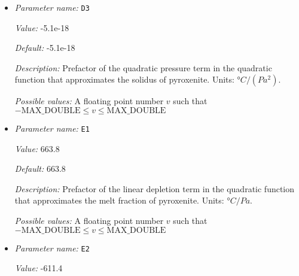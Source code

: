 \begin{itemize}
{\it Value:} 1.329e-7


{\it Default:} 1.329e-7


{\it Description:} Prefactor of the linear pressure term in the quadratic function that approximates the solidus of pyroxenite. Note that this factor is different from the value given in Sobolev, 2011, because they use the potential temperature whereas we use the absolute temperature. Units: $°C/Pa$.


{\it Possible values:} A floating point number $v$ such that $-\text{MAX\_DOUBLE} \leq v \leq \text{MAX\_DOUBLE}$
\item {\it Parameter name:} {\tt D3}
\label{parameters:Postprocess/Visualization/Melt fraction/D3}
\label{parameters:Postprocess/Visualization/Melt_20fraction/D3}


{\it Value:} -5.1e-18


{\it Default:} -5.1e-18


{\it Description:} Prefactor of the quadratic pressure term in the quadratic function that approximates the solidus of pyroxenite. Units: $°C/(Pa^2)$.


{\it Possible values:} A floating point number $v$ such that $-\text{MAX\_DOUBLE} \leq v \leq \text{MAX\_DOUBLE}$
\item {\it Parameter name:} {\tt E1}
\label{parameters:Postprocess/Visualization/Melt fraction/E1}
\label{parameters:Postprocess/Visualization/Melt_20fraction/E1}


{\it Value:} 663.8


{\it Default:} 663.8


{\it Description:} Prefactor of the linear depletion term in the quadratic function that approximates the melt fraction of pyroxenite. Units: $°C/Pa$.


{\it Possible values:} A floating point number $v$ such that $-\text{MAX\_DOUBLE} \leq v \leq \text{MAX\_DOUBLE}$
\item {\it Parameter name:} {\tt E2}
\label{parameters:Postprocess/Visualization/Melt fraction/E2}
\label{parameters:Postprocess/Visualization/Melt_20fraction/E2}


{\it Value:} -611.4



\end{itemize}
